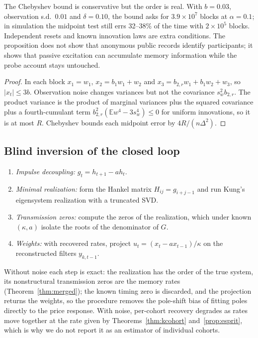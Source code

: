 \documentclass[12pt]{article}
\theoremstyle{definition}
\theoremstyle{remark}
\newcommand{\E}{\mathbb{E}}
\begin{document}
The Chebyshev bound is conservative but the order is real. With $b=0.03$, observation s.d.\ $0.01$ and $\delta=0.10$, the bound asks for $3.9\times10^7$ blocks at $\alpha=0.1$; in simulation the midpoint test still errs 32--38\% of the time with $2\times10^5$ blocks. Independent resets and known innovation laws are extra conditions. The proposition does not show that anonymous public records identify participants; it shows that passive excitation can accumulate memory information while the probe account stays untouched.

\begin{proof} In each block $x_1=w_1$, $x_2=b_1w_1+w_2$ and $x_3=b_{2,r}w_1+b_1w_2+w_3$, so $|x_t|\le3b$. Observation noise changes variances but not the covariance $s_w^2b_{2,r}$. The product variance is the product of marginal variances plus the squared covariance plus a fourth-cumulant term $b_{2,r}^2(\E w^4-3s_w^4)\le0$ for uniform innovations, so it is at most $R$. Chebyshev bounds each midpoint error by $4R/(n\Delta^2)$.
\end{proof}

\subsection{Blind inversion of the closed loop}\label{app:era}
\begin{enumerate}[itemsep=1pt]
\item \emph{Impulse decoupling:} $g_t=h_{t+1}-ah_t$.
\item \emph{Minimal realization:} form the Hankel matrix $H_{ij}=g_{i+j-1}$ and run Kung's eigensystem realization with a truncated SVD.
\item \emph{Transmission zeros:} compute the zeros of the realization, which under known $(\kappa,a)$ isolate the roots of the denominator of $G$.
\item \emph{Weights:} with recovered rates, project $u_t=(x_t-ax_{t-1})/\kappa$ on the reconstructed filters $y_{k,t-1}$.
\end{enumerate}
Without noise each step is exact: the realization has the order of the true system, its nonstructural transmission zeros are the memory rates (Theorem~\ref{thm:merged}); the known timing zero is discarded, and the projection returns the weights, so the procedure removes the pole-shift bias of fitting poles directly to the price response. With noise, per-cohort recovery degrades as rates move together at the rate given by Theorems~\ref{thm:kcohort} and~\ref{prop:esprit}, which is why we do not report it as an estimator of individual cohorts.
\end{document}
